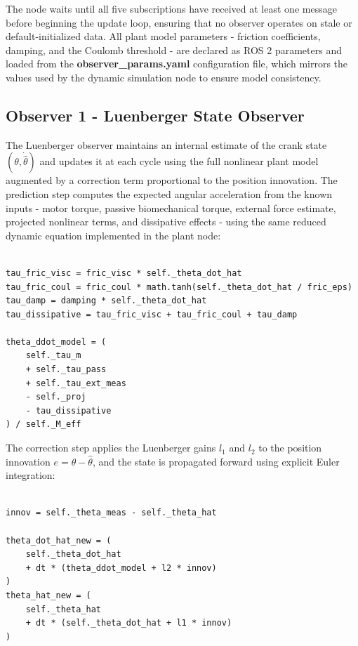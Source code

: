 The node waits until all five subscriptions have received at least one message before beginning the update loop, ensuring that no observer operates on stale or default-initialized data. All plant model parameters - friction coefficients, damping, and the Coulomb threshold - are declared as ROS 2 parameters and loaded from the \textbf{observer\_params.yaml} configuration file, which mirrors the values used by the dynamic simulation node to ensure model consistency.

\subsection{Observer 1 - Luenberger State Observer}
The Luenberger observer maintains an internal estimate of the crank state $(\theta, \dot{\hat{\theta}})$ and updates it at each cycle using the full nonlinear plant model augmented by a correction term proportional to the position innovation. The prediction step computes the expected angular acceleration from the known inputs - motor torque, passive biomechanical torque, external force estimate, projected nonlinear terms, and dissipative effects - using the same reduced dynamic equation implemented in the plant node:

\begin{verbatim}

tau_fric_visc = fric_visc * self._theta_dot_hat
tau_fric_coul = fric_coul * math.tanh(self._theta_dot_hat / fric_eps)
tau_damp = damping * self._theta_dot_hat
tau_dissipative = tau_fric_visc + tau_fric_coul + tau_damp

theta_ddot_model = (
    self._tau_m
    + self._tau_pass
    + self._tau_ext_meas
    - self._proj
    - tau_dissipative
) / self._M_eff

\end{verbatim}

The correction step applies the Luenberger gains $l_1$ and $l_2$ to the position innovation $e = \theta - \hat{\theta}$, and the state is propagated forward using explicit Euler integration:

\begin{verbatim}

innov = self._theta_meas - self._theta_hat

theta_dot_hat_new = (
    self._theta_dot_hat
    + dt * (theta_ddot_model + l2 * innov)
)
theta_hat_new = (
    self._theta_hat
    + dt * (self._theta_dot_hat + l1 * innov)
)

\end{verbatim}

